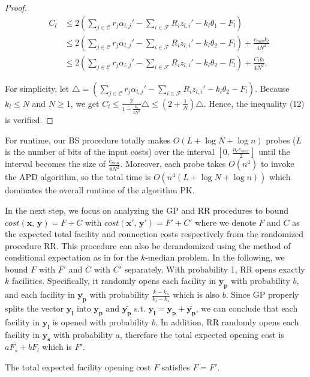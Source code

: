 \documentclass[10pt]{llncs}
\begin{document}
\begin{proof}
\begin{eqnarray*}
 & C_{l} & \leq2\left(\sum_{j\in\mathcal{C}}r_{j}\alpha_{l,j}'-\sum_{i\in\mathcal{F}}R_{i}z_{l,i}'-k_{l}\theta_{1}-F_{l}\right)\\
 &  & \leq2\left(\sum_{j\in\mathcal{C}}r_{j}\alpha_{l,j}'-\sum_{i\in\mathcal{F}}R_{i}z_{l,i}'-k_{l}\theta_{2}-F_{l}\right)+\frac{c_{min}k_{l}}{4N^{2}}\\
 &  & \leq2\left(\sum_{j\in\mathcal{C}}r_{j}\alpha_{l,j}'-\sum_{i\in\mathcal{F}}R_{i}z_{l,i}'-k_{l}\theta_{2}-F_{l}\right)+\frac{C_{l}k_{l}}{4N^{2}}.
\end{eqnarray*}


For simplicity, let $\triangle=\left(\sum_{j\in\mathcal{C}}r_{j}\alpha_{l,j}'-\sum_{i\in\mathcal{F}}R_{i}z_{l,i}'-k_{l}\theta_{2}-F_{l}\right)$.
Because $k_{l}\leq N$ and $N\geq1$, we get $C_{l}\leq\frac{2}{1-\frac{k_{l}}{4N^{2}}}\triangle\leq\left(2+\frac{1}{N}\right)\triangle$.
Hence, the inequality (12) is verified.
\end{proof}
For runtime, our BS procedure totally makes $O\left(L+\log N+\log n\right)$
probes ($L$ is the number of bits of the input costs) over the interval
$\left[0,\,\frac{n_{c}c_{max}}{2}\right]$ until the interval becomes
the size of $\frac{c_{min}}{8N^{2}}$. Moreover, each probe takes
$ $$O\left(n^{4}\right)$ to invoke the APD algorithm, so the total
time is $O\left(n^{4}\left(L+\log N+\log n\right)\right)$ which dominates
the overall runtime of the algorithm PK.

In the next step, we focus on analyzing the GP and RR procedures to
bound $cost\left(\boldsymbol{x},\,\boldsymbol{y}\right)=F+C$ with
$cost\left(\boldsymbol{x'},\,\boldsymbol{y'}\right)=F'+C'$ where
we denote $F$ and $C$ as the expected total facility and connection
costs respectively from the randomized procedure RR. This procedure
can also be derandomized using the method of conditional expectation
as in \cite{jain01approximation} for the $k$-median problem. In
the following, we bound $F$ with $F'$ and $C$ with $C'$ separately.
With probability 1, RR opens exactly $k$ facilities. Specifically,
it randomly opens each facility in $\boldsymbol{y_{p}}$ with probability
$b$, and each facility in $\boldsymbol{\bar{y_{p}}}$ with probability
$\frac{k-k_{s}}{k_{l}-k_{s}}$ which is also $b$. Since GP properly
splits the vector $\boldsymbol{y_{l}}$ into $\boldsymbol{y_{p}}$
and $\boldsymbol{\bar{y_{p}}}$ s.t. $\boldsymbol{y_{l}}=\boldsymbol{y_{p}}+\boldsymbol{\bar{y_{p}}}$,
we can conclude that each facility in $\boldsymbol{y_{l}}$ is opened
with probability $b$. In addition, RR randomly opens each facility
in $\boldsymbol{y_{s}}$ with probability $a$, therefore the total
expected opening cost is $aF_{s}+bF_{l}$ which is $F'$.
\begin{lemma}
The total expected facility opening cost $F$ satisfies $F=F'$.
\end{lemma}
\end{document}
